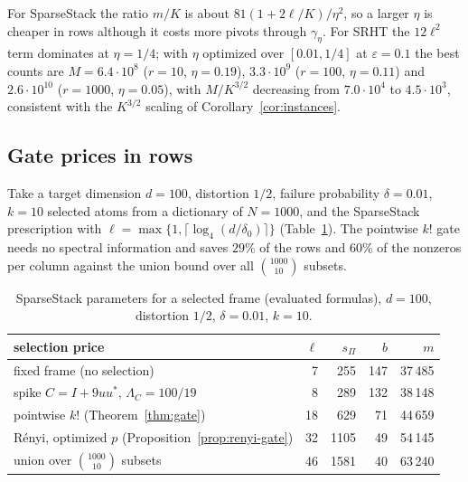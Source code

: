 \documentclass[11pt]{article}
\theoremstyle{definition}\newtheorem{definition}[theorem]{Definition}
\theoremstyle{remark}\newtheorem{remark}[theorem]{Remark}
\newcommand{\eps}{\varepsilon}
\newcommand{\1}{\mathbf 1}
\begin{document}
For SparseStack the ratio $m/K$ is about $81(1+2\ell/K)/\eta^2$, so a larger
$\eta$ is cheaper in rows although it costs more pivots through
$\gamma_\eta$. For SRHT the $12\ell^2$ term dominates at $\eta=1/4$; with
$\eta$ optimized over $[0.01,1/4]$ at $\eps=0.1$ the best counts are
$M=6.4\cdot10^8$ ($r=10$, $\eta=0.19$), $3.3\cdot10^9$ ($r=100$,
$\eta=0.11$) and $2.6\cdot10^{10}$ ($r=1000$, $\eta=0.05$), with
$M/K^{3/2}$ decreasing from $7.0\cdot10^4$ to $4.5\cdot10^3$, consistent
with the $K^{3/2}$ scaling of Corollary~\ref{cor:instances}.

\subsection{Gate prices in rows}
Take a target dimension $d=100$, distortion $1/2$, failure probability
$\delta=0.01$, $k=10$ selected atoms from a dictionary of $N=1000$, and
the SparseStack prescription with $\ell=\max\{1,\lceil\log_4(d/\delta_0)\rceil\}$
(Table~\ref{tab:gate}). The pointwise $k!$ gate needs no spectral
information and saves $29\%$ of the rows and $60\%$ of the nonzeros per
column against the union bound over all $\binom{1000}{10}$ subsets.

\begin{table}[ht]
\centering
\begin{tabular}{lrrrr}
\toprule
selection price & $\ell$ & $s_\Pi$ & $b$ & $m$\\
\midrule
fixed frame (no selection) & 7 & 255 & 147 & 37\,485\\
spike $C=I+9uu^*$, $\Lambda_C=100/19$ & 8 & 289 & 132 & 38\,148\\
pointwise $k!$ (Theorem~\ref{thm:gate}) & 18 & 629 & 71 & 44\,659\\
R\'enyi, optimized $p$ (Proposition~\ref{prop:renyi-gate}) & 32 & 1105 & 49 & 54\,145\\
union over $\binom{1000}{10}$ subsets & 46 & 1581 & 40 & 63\,240\\
\bottomrule
\end{tabular}
\caption{SparseStack parameters for a selected frame (evaluated
formulas), $d=100$, distortion $1/2$, $\delta=0.01$, $k=10$.}
\label{tab:gate}
\end{table}
\end{document}
